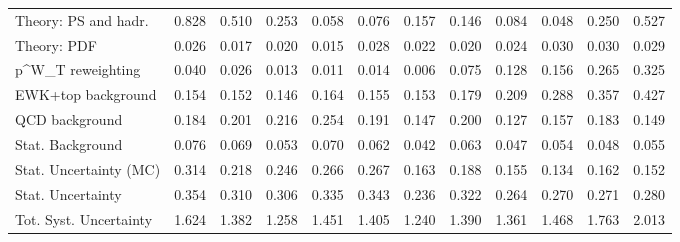 \begin{tabular}{l|p{0.6cm}p{0.6cm}p{0.6cm}p{0.6cm}p{0.6cm}p{0.6cm}p{0.6cm}p{0.6cm}p{0.6cm}p{0.6cm}p{0.6cm}}
Theory: PS and hadr.                     & 0.828 & 0.510 & 0.253 & 0.058 & 0.076 & 0.157 & 0.146 & 0.084 & 0.048 & 0.250 & 0.527 \\
Theory: PDF                              & 0.026 & 0.017 & 0.020 & 0.015 & 0.028 & 0.022 & 0.020 & 0.024 & 0.030 & 0.030 & 0.029 \\
p^{W}_{T} reweighting                    & 0.040 & 0.026 & 0.013 & 0.011 & 0.014 & 0.006 & 0.075 & 0.128 & 0.156 & 0.265 & 0.325 \\
EWK+top background                       & 0.154 & 0.152 & 0.146 & 0.164 & 0.155 & 0.153 & 0.179 & 0.209 & 0.288 & 0.357 & 0.427 \\
QCD background                           & 0.184 & 0.201 & 0.216 & 0.254 & 0.191 & 0.147 & 0.200 & 0.127 & 0.157 & 0.183 & 0.149 \\
Stat. Background                         & 0.076 & 0.069 & 0.053 & 0.070 & 0.062 & 0.042 & 0.063 & 0.047 & 0.054 & 0.048 & 0.055 \\
Stat. Uncertainty (MC)                   & 0.314 & 0.218 & 0.246 & 0.266 & 0.267 & 0.163 & 0.188 & 0.155 & 0.134 & 0.162 & 0.152 \\
\hline
Stat. Uncertainty                        & 0.354 & 0.310 & 0.306 & 0.335 & 0.343 & 0.236 & 0.322 & 0.264 & 0.270 & 0.271 & 0.280 \\
\hline
Tot. Syst. Uncertainty                   & 1.624 & 1.382 & 1.258 & 1.451 & 1.405 & 1.240 & 1.390 & 1.361 & 1.468 & 1.763 & 2.013 \\
\hline
\end{tabular}
